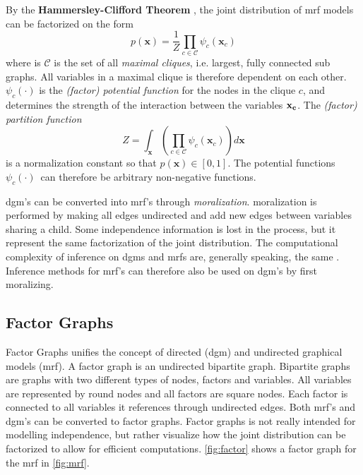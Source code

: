 By the \textbf{Hammersley-Clifford Theorem} \cite[p.~ 668]{murphy}, the joint distribution of \acrshort{mrf} models can be factorized on the form
\begin{equation}
    p(\mathbf{x}) =\frac{1}{Z} \prod_{c \in \mathcal{C}} \psi_c(\mathbf{x}_c)
\end{equation}
where is $\mathcal{C}$ is the set of all \textit{maximal cliques}, i.e. largest, fully connected sub graphs. All variables in a maximal clique is therefore dependent on each other. $\psi_c(\cdot)$ is the \textit{(factor) potential function} for the nodes in the clique $c$, and determines the strength of the interaction between the variables $\bf{x}_c$. The \textit{(factor) partition function}
\begin{equation}
    Z = \int_\mathbf{x} (\prod_{c \in \mathcal{C}} \psi_c(\mathbf{x}_c)) d \mathbf{x}
\end{equation}
is a normalization constant so that $p(\mathbf{x}) \in [0, 1]$. The potential functions $\psi_c(\cdot)$ can therefore be arbitrary non-negative functions. 

\acrshort{dgm}'s can be converted into \acrshort{mrf}'s through \textit{\gls{moralization}}. \Gls{moralization} is performed by making all edges undirected and add new edges between variables sharing a child. Some independence information is lost in the process, but it represent the same factorization of the joint distribution. The computational complexity of inference on \acrshort{dgm}s and \acrshort{mrf}s are, generally speaking, the same  \cite{murphy}. Inference methods for \acrshort{mrf}'s can therefore also be used on \acrshort{dgm}'s by first moralizing.


\subsection{Factor Graphs}
Factor Graphs unifies the concept of directed (\acrshort{dgm}) and undirected graphical models (\acrshort{mrf}). A factor graph is an undirected bipartite graph. Bipartite graphs are graphs with two different types of nodes, factors and variables. All variables are represented by round nodes and all factors are square nodes. Each factor is connected to all variables it references through undirected edges. Both \acrshort{mrf}'s and \acrshort{dgm}'s can be converted to factor graphs. Factor graphs is not really intended for modelling independence, but rather visualize how the joint distribution can be factorized to allow for efficient computations. \cref{fig:factor} shows a factor graph for the \acrshort{mrf} in \cref{fig:mrf}.

